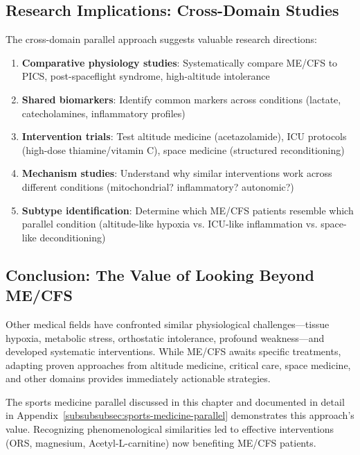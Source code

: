 \subsection{Research Implications: Cross-Domain Studies}
\label{subsec:cross-domain-research}

The cross-domain parallel approach suggests valuable research directions:

\begin{enumerate}
    \item \textbf{Comparative physiology studies}: Systematically compare ME/CFS to PICS, post-spaceflight syndrome, high-altitude intolerance
    \item \textbf{Shared biomarkers}: Identify common markers across conditions (lactate, catecholamines, inflammatory profiles)
    \item \textbf{Intervention trials}: Test altitude medicine (acetazolamide), ICU protocols (high-dose thiamine/vitamin C), space medicine (structured reconditioning)
    \item \textbf{Mechanism studies}: Understand why similar interventions work across different conditions (mitochondrial? inflammatory? autonomic?)
    \item \textbf{Subtype identification}: Determine which ME/CFS patients resemble which parallel condition (altitude-like hypoxia vs. ICU-like inflammation vs. space-like deconditioning)
\end{enumerate}

\subsection{Conclusion: The Value of Looking Beyond ME/CFS}
\label{subsec:cross-domain-conclusion}

Other medical fields have confronted similar physiological challenges—tissue hypoxia, metabolic stress, orthostatic intolerance, profound weakness—and developed systematic interventions. While ME/CFS awaits specific treatments, adapting proven approaches from altitude medicine, critical care, space medicine, and other domains provides immediately actionable strategies.

The sports medicine parallel discussed in this chapter and documented in detail in Appendix~\ref{subsubsubsec:sports-medicine-parallel} demonstrates this approach's value. Recognizing phenomenological similarities led to effective interventions (ORS, magnesium, Acetyl-L-carnitine) now benefiting ME/CFS patients.

